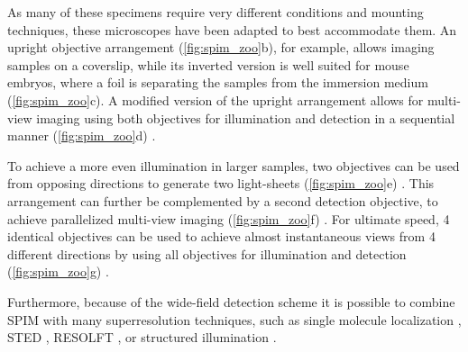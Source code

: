   As many of these specimens require very different conditions and mounting techniques, these microscopes have been adapted to best accommodate them. An upright objective arrangement (\autoref{fig:spim_zoo}b), for example, allows imaging samples on a coverslip, while its inverted version is well suited for mouse embryos, where a foil is separating the samples from the immersion medium (\autoref{fig:spim_zoo}c). A modified version of the upright arrangement allows for multi-view imaging using both objectives for illumination and detection in a sequential manner (\autoref{fig:spim_zoo}d) \cite{kumar_dual-view_2014}.

  To achieve a more even illumination in larger samples, two objectives can be used from opposing directions to generate two light-sheets (\autoref{fig:spim_zoo}e) \cite{huisken_even_2007}. This arrangement can further be complemented by a second detection objective, to achieve parallelized multi-view imaging (\autoref{fig:spim_zoo}f) \cite{krzic_multiview_2012,tomer_quantitative_2012, schmid_high-speed_2013}. For ultimate speed, 4 identical objectives can be used to achieve almost instantaneous views from 4 different directions by using all objectives for illumination and detection (\autoref{fig:spim_zoo}g) \cite{chhetri_whole-animal_2015}. 

  Furthermore, because of the wide-field detection scheme it is possible to combine SPIM with many superresolution techniques, such as single molecule localization \cite{cella_zanacchi_live-cell_2011}, STED \cite{friedrich_sted-spim:_2011}, RESOLFT \cite{hoyer_breaking_2016}, or structured illumination \cite{keller_fast_2010,chen_lattice_2014,chang_csilsfm_2017}.





